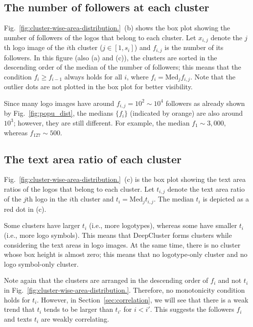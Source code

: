 \documentclass[runningheads]{llncs}
\begin{document}
\subsection{The number of followers at each cluster}
Fig.~\ref{fig:cluster-wise-area-distribution.}~(b) shows the box plot showing the number of followers of the logos that belong to each cluster. Let $x_{i,j}$ denote the $j$th logo image of the $i$th cluster ($j\in [1,s_i]$) and $f_{i,j}$ is the number of its followers.
In this figure (also (a) and (c)), the clusters are sorted in the descending order of the median of the number of followers; this means that the condition $f_i\geq f_{i-1}$ always holds for all $i$, where $f_i = \mathrm{Med}_jf_{i,j}$. Note that the outlier dots are not plotted in the box plot for better visibility. \par
Since many logo images have around $f_{i,j} = 10^2\sim 10^4$ followers
as already shown by Fig.~\ref{fig:popu_dist}, the medians $\{f_i\}$ (indicated by orange) are also around $10^3$; however, they are still different. For example, the median $f_1\sim 3,000$, whereas $f_{127}\sim 500$. 

\subsection{The text area ratio of each cluster}
Fig.~\ref{fig:cluster-wise-area-distribution.}~(c) is the box plot showing the text area ratios of the logos that belong to each cluster. Let $t_{i,j}$ denote the text area ratio of the $j$th logo in the $i$th cluster and $t_i = \mathrm{Med}_j t_{i,j}$. The median $t_i$ is depicted as a red dot in (c). \par
%
Some clusters have larger $t_i$ (i.e., more logotypes), whereas some have smaller $t_i$ (i.e., more logo symbols). This means that DeepCluster forms clusters while considering the text areas in logo images. At the same time, there is no cluster whose box height is almost zero; this means that no logotype-only cluster and no logo symbol-only cluster.\par
%
Note again that the clusters are arranged in the descending order of $f_i$ and not $t_i$ in Fig.~\ref{fig:cluster-wise-area-distribution.}. Therefore, no monotonicity condition holds for $t_i$. However, in Section~\ref{sec:correlation}, we will see that there is a weak trend that 
$t_i$ tends to be larger than $t_{i'}$ for $i<i'$. This suggests the followers $f_i$ and texts $t_i$ are weakly correlating.
\end{document}
